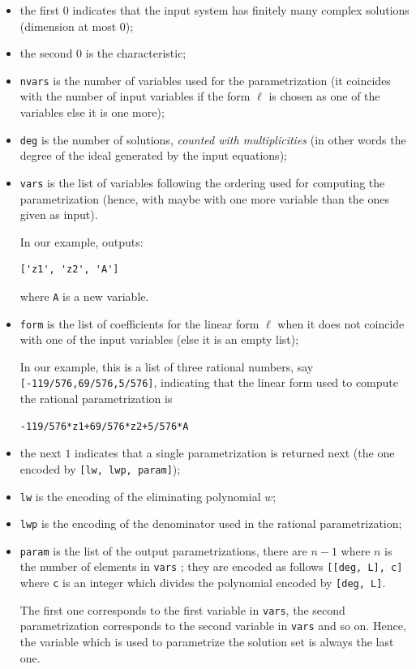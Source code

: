 \documentclass[a4paper,english,11pt]{scrartcl}
\theoremstyle{definition}
\theoremstyle{remark}
\begin{document}
\begin{itemize}
\item the first $0$ indicates that the input system has finitely
  many complex solutions (dimension at most $0$);
\item the second $0$ is the characteristic;
\item \verb+nvars+ is the number of variables used for the parametrization (it
  coincides with the number of input variables if the form $\ell$ is chosen
  as one of the variables else it is one more);
\item \verb+deg+ is the number of solutions, \emph{counted with multiplicities}
  (in other words the degree of the ideal generated by the input equations);
\item \verb+vars+ is the list of variables following the ordering used for
  computing the parametrization (hence, with maybe with one
  more variable than the ones given as input).

  In our example, \msolve outputs:
\begin{verbatim}
['z1', 'z2', 'A']
\end{verbatim}
where \verb+A+ is a new variable.

\item \texttt{form} is the list of coefficients for the linear form $\ell$ when
  it does not coincide with one of the input variables (else it is an empty list);

  In our example, this is a list of three rational numbers,
  say \verb+[-119/576,69/576,5/576]+,
  indicating that the linear form used to compute the rational parametrization is
\begin{verbatim}
-119/576*z1+69/576*z2+5/576*A
\end{verbatim}
\item the next $1$ indicates that a single parametrization is returned next (the one encoded by \verb+[lw, lwp, param]+);
\item \verb+lw+ is the encoding of the eliminating polynomial $w$;
\item \verb+lwp+ is the encoding of the denominator used in the rational
  parametrization;
\item \verb+param+ is the list of the output parametrizations, there are $n-1$ where
    $n$ is the number of elements in \verb+vars+ ;
    they are encoded as follows \verb+[[deg, L], c]+ where \verb+c+ is
    an integer which divides the polynomial encoded by \verb+[deg, L]+.

    The first one corresponds to the first variable in \verb+vars+, the
    second parametrization corresponds to the second variable in \verb+vars+
    and so on. Hence, the variable which is used to parametrize the solution
    set is always the last one.
\end{itemize}
\end{document}
